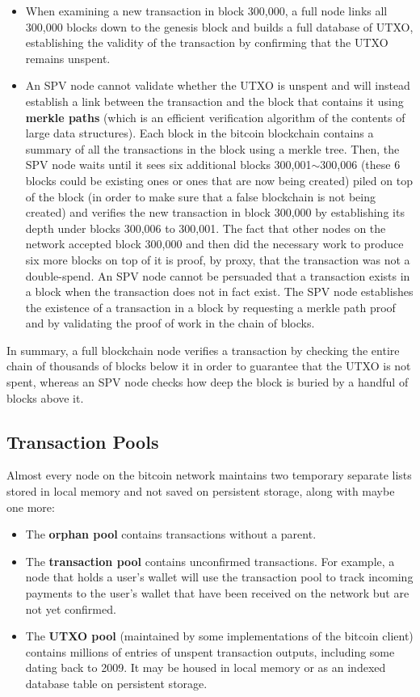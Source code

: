 \documentclass{article}
\newcounter{example}[section]
\newcounter{algo}[section]
\begin{document}
    \begin{itemize}
      \item When examining a new transaction in block 300,000, a full node links all 300,000 blocks down to the genesis block and builds a full database of UTXO, establishing the validity of the transaction by confirming that the UTXO remains unspent.
      \item An SPV node cannot validate whether the UTXO is unspent and will instead establish a link between the transaction and the block that contains it using \textbf{merkle paths} (which is an efficient verification algorithm of the contents of large data structures). Each block in the bitcoin blockchain contains a summary of all the transactions in the block using a merkle tree. Then, the SPV node waits until it sees six additional blocks 300,001$\sim$300,006 (these 6 blocks could be existing ones or ones that are now being created) piled on top of the block (in order to make sure that a false blockchain is not being created) and verifies the new transaction in block 300,000 by establishing its depth under blocks 300,006 to 300,001. The fact that other nodes on the network accepted block 300,000 and then did the necessary work to produce six more blocks on top of it is proof, by proxy, that the transaction was not a double-spend. An SPV node cannot be persuaded that a transaction exists in a block when the transaction does not in fact exist. The SPV node establishes the existence of a transaction in a block by requesting a merkle path proof and by validating the proof of work in the chain of blocks.
    \end{itemize}

    In summary, a full blockchain node verifies a transaction by checking the entire chain of thousands of blocks below it in order to guarantee that the UTXO is not spent, whereas an SPV node checks how deep the block is buried by a handful of blocks above it.

  \subsection{Transaction Pools}

    Almost every node on the bitcoin network maintains two temporary separate lists stored in local memory and not saved on persistent storage, along with maybe one more:

    \begin{itemize}
      \item The \textbf{orphan pool} contains transactions without a parent.
      \item The \textbf{transaction pool} contains unconfirmed transactions. For example, a node that holds a user's wallet will use the transaction pool to track incoming payments to the user's wallet that have been received on the network but are not yet confirmed.
      \item The \textbf{UTXO pool} (maintained by some implementations of the bitcoin client) contains millions of entries of unspent transaction outputs, including some dating back to 2009. It may be housed in local memory or as an indexed database table on persistent storage.
    \end{itemize}
\end{document}
